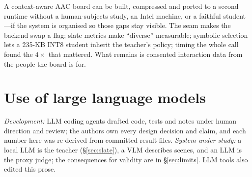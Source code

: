 A context-aware AAC board can be built, compressed and ported to a second
runtime without a human-subjects study, an Intel machine, or a faithful
student---if the system is organised so those gaps stay visible. The seam makes
the backend swap a flag; slate metrics make ``diverse'' measurable; symbolic
selection lets a 235-KB INT8 student inherit the teacher's policy; timing the
whole call found the $4\times$ that mattered. What remains is consented
interaction data from the people the board is for.

\section*{Use of large language models}

\emph{Development:} LLM coding agents drafted code, tests and notes under human
direction and review; the authors own every design decision and claim, and each
number here was re-derived from committed result files. \emph{System under
study:} a local LLM is the teacher (\S\ref{sec:slate}), a VLM describes scenes,
and an LLM is the proxy judge; the consequences for validity are in
\S\ref{sec:limits}. LLM tools also edited this prose.

